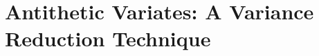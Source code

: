 \documentclass[12pt]{article}
\theoremstyle{plain}
\theoremstyle{definition}
\theoremstyle{remark}
\begin{document}


\clearpage
\section{Antithetic Variates: A Variance Reduction Technique}
\end{document}
